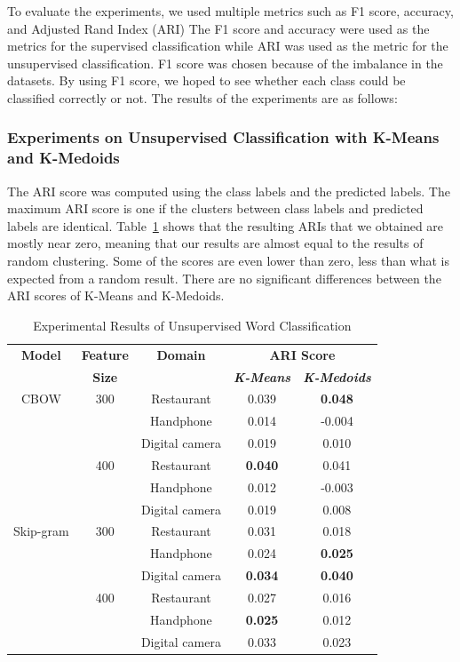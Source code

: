 \documentclass[a4paper,conference]{IEEEtran}
\begin{document}
To evaluate the experiments, we used multiple metrics such as F1 score, accuracy, and Adjusted Rand Index (ARI) The F1 score and accuracy were used as the metrics for the supervised classification while ARI was used as the metric for the unsupervised classification. F1 score was chosen because of the imbalance in the datasets. By using F1 score, we hoped to see whether each class could be classified correctly or not. The results of the experiments are as follows:

\subsubsection{Experiments on Unsupervised Classification with K-Means and K-Medoids}
The ARI score was computed using the class labels and the predicted labels. The maximum ARI score is one if the clusters between class labels and predicted labels are identical. Table~\ref{tab5} shows that the resulting ARIs that we obtained are mostly near zero, meaning that our results are almost equal to the results of random clustering. Some of the scores are even lower than zero, less than what is expected from a random result. There are no significant differences between the ARI scores of K-Means and K-Medoids.

\begin{table}[htbp]
\caption{Experimental Results of Unsupervised Word Classification}
\begin{center}
\begin{tabular}{|c|c|c|c|c|}
\hline
\textbf{Model}&\textbf{Feature}&\textbf{Domain}&\multicolumn{2}{|c|}{\textbf{ARI Score}}\\
\cline{4-5}
&\textbf{Size}& & \textbf{\textit{K-Means}}&\textbf{\textit{K-Medoids}}\\
\hline
CBOW&300&Restaurant&0.039&\textbf{0.048} \\
\cline{3-5}
&&Handphone&0.014&-0.004 \\
\cline{3-5}
&&Digital camera&0.019&0.010 \\
\cline{2-5}
&400&Restaurant&\textbf{0.040}&0.041 \\
\cline{3-5}
&&Handphone&0.012&-0.003 \\
\cline{3-5}
&&Digital camera&0.019&0.008 \\
\hline
Skip-gram&300&Restaurant&0.031&0.018 \\
\cline{3-5}
&&Handphone&0.024&\textbf{0.025} \\
\cline{3-5}
&&Digital camera&\textbf{0.034}&\textbf{0.040} \\
\cline{2-5}
&400&Restaurant&0.027&0.016 \\
\cline{3-5}
&&Handphone&\textbf{0.025}&0.012 \\
\cline{3-5}
&&Digital camera&0.033&0.023 \\
\hline
\end{tabular}
\label{tab5}
\end{center}
\end{table}
\end{document}
